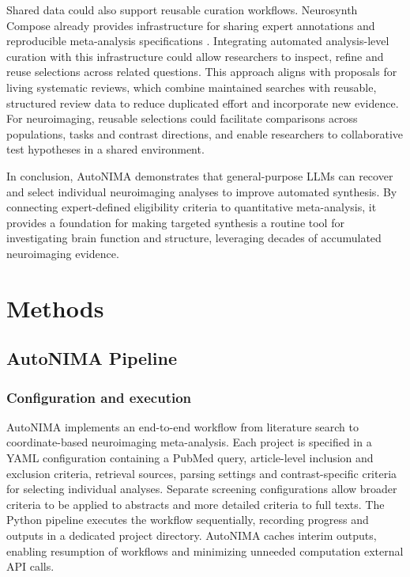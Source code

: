 Shared data could also support reusable curation workflows. Neurosynth Compose already provides infrastructure for sharing expert annotations and reproducible meta-analysis specifications \cite{Kent2026-qb}. Integrating automated analysis-level curation with this infrastructure could allow researchers to inspect, refine and reuse selections across related questions. This approach aligns with proposals for living systematic reviews, which combine maintained searches with reusable, structured review data to reduce duplicated effort and incorporate new evidence\cite{Elliott2014-tu}. For neuroimaging, reusable selections could facilitate comparisons across populations, tasks and contrast directions, and enable researchers to collaborative test hypotheses in a shared environment.

In conclusion, AutoNIMA demonstrates that general-purpose LLMs can recover and select individual neuroimaging analyses to improve automated synthesis. By connecting expert-defined eligibility criteria to quantitative meta-analysis, it provides a foundation for making targeted synthesis a routine tool for investigating brain function and structure, leveraging decades of accumulated neuroimaging evidence.

\section{Methods}

\subsection{AutoNIMA Pipeline}

\subsubsection{Configuration and execution}

AutoNIMA implements an end-to-end workflow from literature search to coordinate-based neuroimaging meta-analysis. Each project is specified in a YAML configuration containing a PubMed query, article-level inclusion and exclusion criteria, retrieval sources, parsing settings and contrast-specific criteria for selecting individual analyses. Separate screening configurations allow broader criteria to be applied to abstracts and more detailed criteria to full texts. The Python pipeline executes the workflow sequentially, recording progress and outputs in a dedicated project directory. AutoNIMA caches interim outputs, enabling resumption of workflows and minimizing unneeded computation external API calls.


